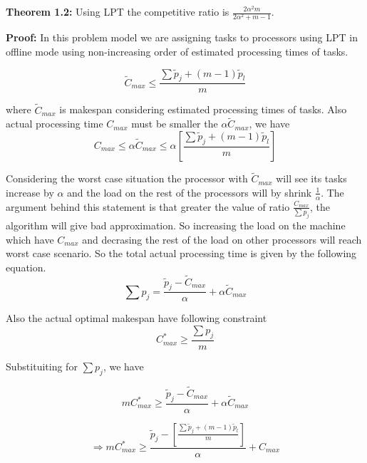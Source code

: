 \documentclass[10pt, conference, compsocconf]{IEEEtran}
\begin{document}
\textbf{Theorem 1.2:} Using LPT the competitive ratio is $ \frac{2\alpha^{2}m}{2\alpha^{2}+ m-1}$.

\textbf{Proof:} In this problem model we are assigning tasks to processors using LPT in offline mode using non-increasing order of estimated processing times of tasks.

 


 
\begin{equation}
\tilde C_{max}\leq  \frac{\sum{\tilde p_j + (m-1) \tilde p_l} }{m}
\end{equation}

where $\tilde C_{max}$ is makespan considering estimated processing  times  of tasks.  Also actual processing time  $C_{max}$ must be smaller the $\alpha\tilde C_{max}$, we have \\

\begin{equation}
 C_{max}\leq \alpha \tilde C_{max}\leq \alpha [\frac{\sum{\tilde p_j + (m-1) \tilde p_l} }{m}] 
\end{equation} 

Considering the worst case situation the processor with $\tilde C_{max}$ will see its tasks increase by $\alpha$  and the load on the  rest of the processors will by shrink  $\frac{1}{\alpha}$.  The argument behind this statement is that greater the value of ratio $\frac{C_{max}}{\sum{p_j}}$, the algorithm will give bad approximation. So increasing the load on the machine which have $C_{max} $ and decrasing the rest of the load on other processors will reach worst case scenario. So the total actual processing time is given by the  following equation.
 \begin{equation}
 \sum {p_j} = \frac{\tilde p_j- \tilde C_{max}}{\alpha} + \alpha \tilde C_{max}
 \end{equation}
 
 Also the actual optimal makespan have following constraint
 \begin{equation}\nonumber 
C_{max}^{*}\geq \frac{\sum {p_j}}{m}
\end{equation}

Substituiting for  $ \sum {p_j}$, we have

 \begin{equation}\nonumber 
 m C_{max}^{*}\geq \frac{\tilde p_j- \tilde C_{max}}{\alpha} + \alpha \tilde C_{max}
 \end{equation}
 
\begin{equation}\nonumber 
\Rightarrow m C_{max}^{*}\geq \frac{\tilde p_j-[\frac{\sum{\tilde p_j + (m-1) \tilde p_l }}{m}]} {\alpha} + {C_{max}}
\end{equation}
\end{document}
